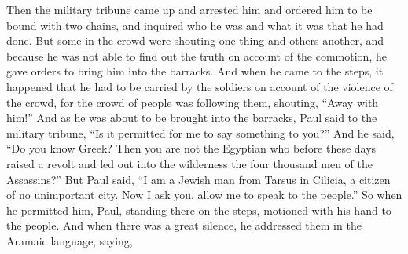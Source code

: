 \begin{biblechapter}
\verse Then the military tribune came up and arrested him and ordered him to be bound with two chains, and inquired who he was and what it was that he had done.
\verse But some in the crowd were shouting one thing and others another, and because he was not able to find out the truth on account of the commotion, he gave orders to bring him into the barracks.
\verse And when he came to the steps, it happened that he had to be carried by the soldiers on account of the violence of the crowd,
\verse for the crowd of people was following them, shouting, “Away with him!”
 And as he was about to be brought into the barracks, Paul said to the military tribune, “Is it permitted for me to say something to you?” And he said, “Do you know Greek?
\verse Then you are not the Egyptian who before these days raised a revolt and led out into the wilderness the four thousand men of the Assassins?”
\verse But Paul said, “I am a Jewish man from Tarsus in Cilicia, a citizen of no unimportant city. Now I ask you, allow me to speak to the people.”
\verse So when he permitted him, Paul, standing there on the steps, motioned with his hand to the people. And when there was a great silence, he addressed them in the Aramaic language, saying,
\end{biblechapter}

